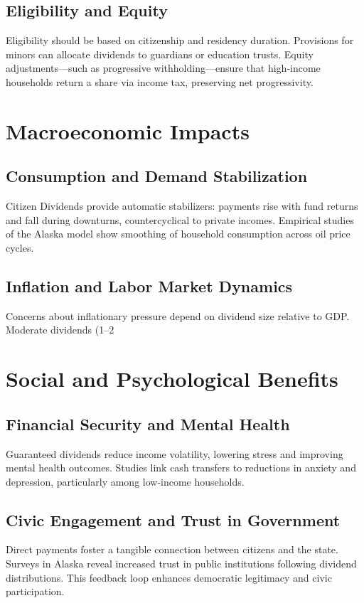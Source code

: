 \documentclass[11pt]{article}
\begin{document}
\subsection{Eligibility and Equity}
Eligibility should be based on citizenship and residency duration. Provisions for minors can allocate dividends to guardians or education trusts. Equity adjustments—such as progressive withholding—ensure that high-income households return a share via income tax, preserving net progressivity.

\section{Macroeconomic Impacts}
\subsection{Consumption and Demand Stabilization}
Citizen Dividends provide automatic stabilizers: payments rise with fund returns and fall during downturns, countercyclical to private incomes. Empirical studies of the Alaska model show smoothing of household consumption across oil price cycles.

\subsection{Inflation and Labor Market Dynamics}
Concerns about inflationary pressure depend on dividend size relative to GDP. Moderate dividends (1–2%

\section{Social and Psychological Benefits}
\subsection{Financial Security and Mental Health}
Guaranteed dividends reduce income volatility, lowering stress and improving mental health outcomes. Studies link cash transfers to reductions in anxiety and depression, particularly among low-income households.

\subsection{Civic Engagement and Trust in Government}
Direct payments foster a tangible connection between citizens and the state. Surveys in Alaska reveal increased trust in public institutions following dividend distributions. This feedback loop enhances democratic legitimacy and civic participation.
\end{document}

